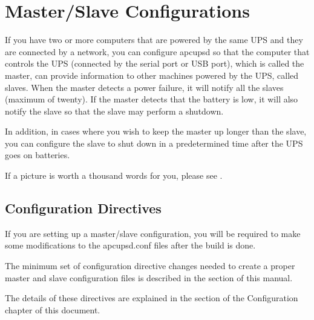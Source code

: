 {{{{{{{{{\label{Master_002fSlave-Configurations}

\section*{Master/Slave Configurations}

\label{index-Master_002fSlave-152}
If you have two or more computers that are powered by the same UPS and they
are connected by a network, you can configure apcupsd so that the computer
that controls the UPS (connected by the serial port or USB port), which is
called the master, can provide information to other machines powered by the
UPS, called slaves. When the master detects a power failure, it will notify
all the slaves (maximum of twenty). If the master detects that the battery is
low, it will also notify the slave so that the slave may perform a shutdown.  

In addition, in cases where you wish to keep the master up longer than the
slave, you can configure the slave to shut down in a predetermined time after
the UPS goes on batteries.  

If a picture is worth a thousand words for you, please see 
. 

\label{Configuration-Directives}

\subsection*{Configuration Directives}

\label{index-Directives-153}
\label{index-Configuration_002c-Directives-154}
If you are setting up a master/slave configuration, you will be required to
make some modifications to the apcupsd.conf files after the build is done.  

The minimum set of configuration directive changes needed to create a proper
master and slave configuration files is described in the 
 section of
this manual.  

The details of these directives are explained in the 
 section of the
Configuration chapter of this document.  

}}}}}}}}}

